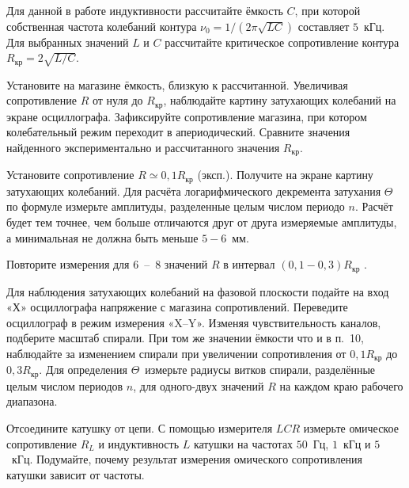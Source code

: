 \begin{lab:task}
	\item Для данной в работе индуктивности рассчитайте ёмкость $C$, при которой
собственная частота колебаний контура $\nu_0 = 1/(2\pi\sqrt{LC})$ составляет
$5$~кГц. Для выбранных значений $L$ и $C$ рассчитайте критическое сопротивление
контура $R_\text{кр} = 2\sqrt{L/C}$. 

	\item Установите на магазине ёмкость, близкую к рассчитанной. Увеличивая
сопротивление $R$ от нуля до  $R_\text{кр}$, наблюдайте картину затухающих
колебаний на экране осциллографа. Зафиксируйте сопротивление магазина, при
котором колебательный режим переходит в апериодический. Сравните значения
найденного экспериментально и рассчитанного значения  $R_\text{кр}$.

	\item Установите сопротивление $R \simeq 0,1 R_\text{кр}$ (эксп.). Получите
на экране картину затухающих колебаний. Для расчёта логарифмического декремента
затухания $\Theta$ по формуле  измерьте амплитуды,
разделенные целым числом периодо $n$. Расчёт будет тем точнее, чем больше
отличаются друг от друга измеряемые амплитуды, а минимальная не должна быть
меньше $5 - 6$~мм.

	\item Повторите измерения для 6~--~8 значений $R$ в интервал
$(0,1-0,3)R_\text{кр}$ .



	\item Для наблюдения затухающих колебаний на фазовой плоскости подайте на
вход «Х» осциллографа напряжение с магазина сопротивлений. Переведите
осциллограф в режим измерения «X--Y». Изменяя чувствительность каналов,
подберите масштаб спирали. При том же значении ёмкости что и в п.~10, наблюдайте
за изменением спирали при увеличении сопротивления от $0,1R_\text{кр}$  до
$0,3R_\text{кр}$. Для определения $\Theta$~измерьте радиусы витков спирали,
разделённые целым числом периодов $n$, для одного-двух значений $R$ на каждом
краю рабочего диапазона.

	\item Отсоедините катушку от цепи. С помощью измерителя $LCR$ измерьте
омическое сопротивление $R_L$ и индуктивность $L$ катушки на частотах $50$~Гц,
$1$~кГц и $5$~кГц. Подумайте, почему результат измерения омического
сопротивления катушки зависит от частоты.



\end{lab:task}
